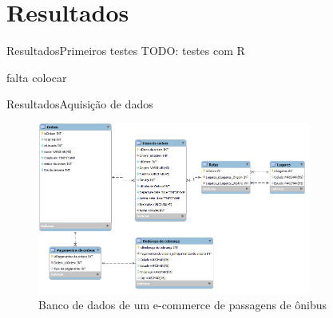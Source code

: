\section[Resultados]{Resultados}

\begin{frame}{Resultados}{Primeiros testes}
TODO: testes com R

falta colocar
\end{frame}

\begin{frame}{Resultados}{Aquisição de dados}
\begin{center}
\begin{figure}[ht]
    \includegraphics[width=0.8\textwidth]{../img/estrutura-banco-de-dados}
    \caption{Banco de dados de um e-commerce de passagens de ônibus}
    \label{fig:bd-clickbus}
\end{figure}
\end{center}
\end{frame}